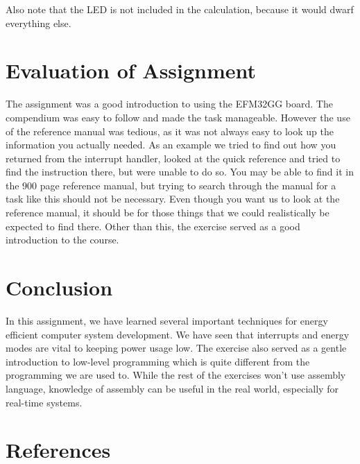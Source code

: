 \documentclass[a4paper, 12pt]{article}
\begin{document}
        Also note that the LED is not included in the calculation, because it would dwarf everything else.

\section{Evaluation of Assignment} %
\label{sec:evaluation_of_assignment}
The assignment was a good introduction to using the EFM32GG board. The compendium was easy to follow and made the task manageable. However the use of the reference manual was tedious, as it was not always easy to look up the information you actually needed. As an example we tried to find out how you returned from the interrupt handler, looked at the quick reference and tried to find the instruction there, but were unable to do so. You may be able to find it in the 900 page reference manual, but trying to search through the manual for a task like this should not be necessary. Even though you want us to look at the reference manual, it should be for those things that we could realistically be expected to find there. Other than this, the exercise served as a good introduction to the course.

\section{Conclusion} %
\label{sec:conclusion}
    In this assignment, we have learned several important techniques for energy efficient computer system development. We have seen that interrupts and energy modes are vital to keeping power usage low. The exercise also served as a gentle introduction to low-level programming which is quite different from the programming we are used to. While the rest of the exercises won't use assembly language, knowledge of assembly can be useful in the real world, especially for real-time systems.

\section{References} %
\label{sec:references}
    
\end{document}
